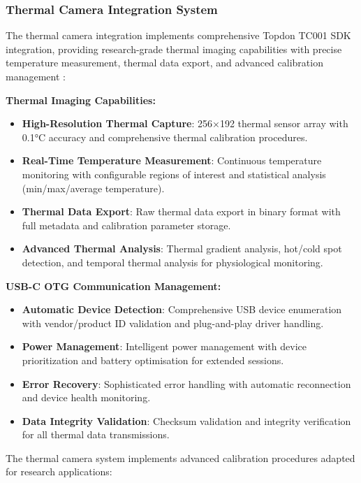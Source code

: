 \documentclass[11pt,a4paper]{report}
\begin{document}
\subsubsection{Thermal Camera Integration System}

The thermal camera integration implements comprehensive Topdon TC001 SDK integration, providing research-grade thermal imaging capabilities with precise temperature measurement, thermal data export, and advanced calibration management \cite{Topdon2024}:

\textbf{Thermal Imaging Capabilities:}
\begin{itemize}
  \item \textbf{High-Resolution Thermal Capture}: 256×192 thermal sensor array with 0.1°C accuracy and comprehensive thermal calibration procedures.
  \item \textbf{Real-Time Temperature Measurement}: Continuous temperature monitoring with configurable regions of interest and statistical analysis (min/max/average temperature).
  \item \textbf{Thermal Data Export}: Raw thermal data export in binary format with full metadata and calibration parameter storage.
  \item \textbf{Advanced Thermal Analysis}: Thermal gradient analysis, hot/cold spot detection, and temporal thermal analysis for physiological monitoring.
\end{itemize}

\textbf{USB-C OTG Communication Management:}
\begin{itemize}
  \item \textbf{Automatic Device Detection}: Comprehensive USB device enumeration with vendor/product ID validation and plug-and-play driver handling.
  \item \textbf{Power Management}: Intelligent power management with device prioritization and battery optimisation for extended sessions.
  \item \textbf{Error Recovery}: Sophisticated error handling with automatic reconnection and device health monitoring.
  \item \textbf{Data Integrity Validation}: Checksum validation and integrity verification for all thermal data transmissions.
\end{itemize}

The thermal camera system implements advanced calibration procedures adapted for research applications:
\end{document}
